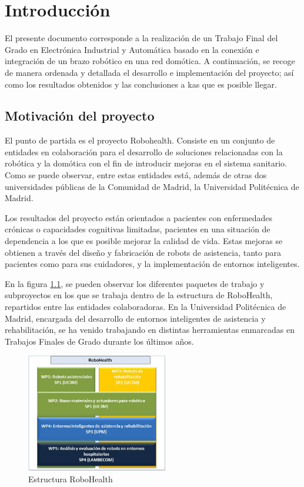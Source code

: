 \chapter{Introducción}

El presente documento corresponde a la realización de un Trabajo Final del Grado en Electrónica Industrial y Automática basado en la conexión e integración de un brazo robótico en una red domótica. A continuación, se recoge de manera ordenada y detallada el desarrollo e implementación del proyecto; así como los resultados obtenidos y las conclusiones a kas que es posible llegar.

\section{Motivación del proyecto}

El punto de partida es el proyecto Robohealth. Consiste en un conjunto de entidades en colaboración para el desarrollo de soluciones relacionadas con la robótica y la domótica con el fin de introducir mejoras en el sistema sanitario. Como se puede observar, entre estas entidades está, además de otras dos universidades públicas de la Comunidad de Madrid, la Universidad Politécnica de Madrid.

Los resultados del proyecto están orientados a pacientes con enfermedades crónicas o capacidades cognitivas limitadas, pacientes en una situación de dependencia a los que es posible mejorar la calidad de vida. Estas mejoras se obtienen a través del diseño y fabricación de robots de asistencia, tanto para pacientes como para sus cuidadores, y la implementación de entornos inteligentes.

En la figura \ref{fig:RH}, se pueden observar los diferentes paquetes de trabajo y subproyectos en los que se trabaja dentro de la estructura de RoboHealth, repartidos entre las entidades colaboradoras. En la Universidad Politécnica de Madrid, encargada del desarrollo de entornos inteligentes de asistencia y rehabilitación, se ha venido trabajando en distintas herramientas enmarcadas en Trabajos Finales de Grado durante los últimos años.

\begin{figure}[tb]
\centering
\includegraphics[width=0.55\textwidth]{figuras/RHstruct.png}
\caption{Estructura RoboHealth}
\label{fig:RH}
\end{figure}

